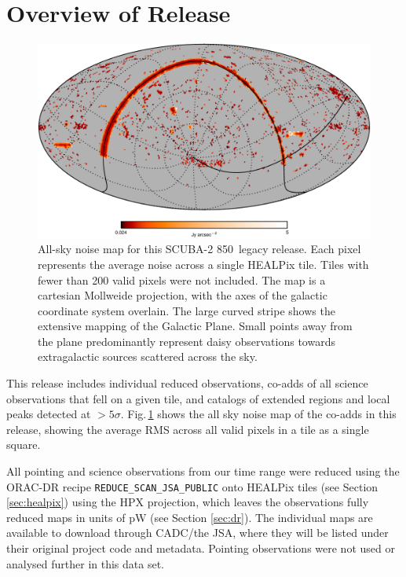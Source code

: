 \documentclass[twocolumn,times]{aastex6}
\newcommand{\um}{\micron}
\begin{document}
\section{Overview of Release}
\begin{figure}
  \centering
  \includegraphics{mollweide-average-noise-galacticaxes-crop}
  \caption{All-sky noise map for this SCUBA-2 850\,\um{} legacy
    release. Each pixel represents the average noise across a single
    HEALPix tile. Tiles with fewer than 200 valid pixels were not
    included. The map is a cartesian Mollweide projection, with the
    axes of the galactic coordinate system overlain. The large curved
    stripe shows the extensive mapping of the Galactic Plane. Small points
    away from the plane predominantly represent daisy observations
    towards extragalactic sources scattered across the sky.}
  \label{fig:noise-mollweide}
\end{figure}

This release includes individual reduced observations, co-adds of all
science observations that fell on a given tile, and catalogs of
extended regions and local peaks detected at
$>5\sigma$. Fig.\,\ref{fig:noise-mollweide} shows the all sky noise map
of the co-adds in this release, showing the average RMS across all
valid pixels in a tile as a single square.

All pointing and science observations from our time range were reduced
using the ORAC-DR recipe \texttt{REDUCE\_SCAN\_JSA\_PUBLIC} onto
HEALPix tiles (see Section \ref{sec:healpix}) using the HPX
projection, which leaves the observations fully reduced maps in units
of pW (see Section \ref{sec:dr}). The individual maps are available to
download through CADC/the JSA, where they will be listed under their
original project code and metadata. Pointing observations were not
used or analysed further in this data set.
\end{document}
